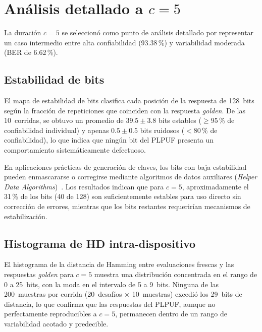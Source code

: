 \section{Análisis detallado a \texorpdfstring{$c = 5$}{c = 5}}
\label{sec:res_detallado}

La duración $c = 5$ se seleccionó como punto de análisis detallado por
representar un caso intermedio entre alta confiabilidad (93.38\,\%) y
variabilidad moderada (BER de 6.62\,\%).

\subsection{Estabilidad de bits}
\label{sec:res_estabilidad}

El mapa de estabilidad de bits clasifica cada posición de la respuesta de
128~bits según la fracción de repeticiones que coinciden con la respuesta
\textit{golden}. De las 10~corridas, se obtuvo un promedio de
$39.5 \pm 3.8$ bits estables ($\geq 95$\,\% de confiabilidad individual) y
apenas $0.5 \pm 0.5$ bits ruidosos ($< 80$\,\% de confiabilidad), lo que
indica que ningún bit del PLPUF presenta un comportamiento
sistemáticamente defectuoso.

En aplicaciones prácticas de generación de claves, los bits con baja
estabilidad pueden enmascararse o corregirse mediante algoritmos de datos
auxiliares (\textit{Helper Data Algorithms})~\cite{delvaux_2015_helper}. Los
resultados indican que para $c = 5$, aproximadamente el 31\,\% de los bits
(40 de 128) son suficientemente estables para uso directo sin corrección de
errores, mientras que los bits restantes requerirían mecanismos de
estabilización.

\subsection{Histograma de HD intra-dispositivo}
\label{sec:res_histograma}

El histograma de la distancia de Hamming entre evaluaciones frescas y las
respuestas \textit{golden} para $c = 5$ muestra una distribución concentrada
en el rango de 0 a 25~bits, con la moda en el intervalo de 5 a 9~bits.
Ninguna de las 200~muestras por corrida (20~desafíos $\times$ 10~muestras)
excedió los 29~bits de distancia, lo que confirma que las respuestas del
PLPUF, aunque no perfectamente reproducibles a $c = 5$, permanecen dentro de
un rango de variabilidad acotado y predecible.

